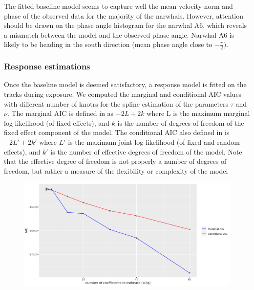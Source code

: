 \documentclass[11pt]{article}
\newcommand {\1}{\mathbb{1}}
\begin{document}
The fitted baseline model seems to capture well the mean velocity norm and phase of the observed data for the majority of the narwhals. However, attention should be drawn on the phase angle histogram for the narwhal A6, which reveals a mismatch between the model and the observed phase angle. Narwhal A6 is likely to be heading in the south direction (mean phase angle close to $-\frac{\pi}{2})$. 


\subsubsection{Response estimations}


Once the baseline model is deemed satisfactory, a response model is fitted on the tracks during exposure. We computed the marginal and conditional AIC values with different number of knotrs for the spline estimation of the parameters $\tau$ and $\nu$. The marginal AIC is defined in \cite{wood_generalized_2017} as $- 2L + 2k$ where L is the maximum marginal log-likelihood (of fixed effects), and $k$ is the number of degrees of freedom of the fixed effect component of the model. The conditional AIC also defined in \cite{wood_generalized_2017} is $- 2L' + 2k'$ where $L'$ is the maximum joint log-likelihood (of fixed and random effects), and $k'$ is the number of effective degrees of freedom of the model. Note that  the effective degree of freedom is not properly a number of degrees of freedom, but rather a measure of the flexibility or complexity of the model %

\begin{figure}[H]
	\centering
	\includegraphics[scale=0.45]{images/unconstrained_models/response/plotAIC3.png}
	\caption{}
	\label{fig: plotAIC3}
\end{figure}
\end{document}
